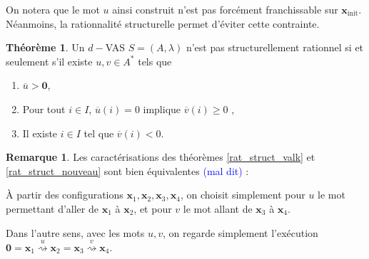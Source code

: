 \documentclass[a4paper,final]{article}
\theoremstyle{definition}
\newtheorem{Theorem}{Théorème}
\newtheorem*{Remark}{Remarque}
\let\geq\geqslant
\newcommand{\alain}[1]{\textcolor{blue}{#1}}
\newcommand{\transZ}[1]{\ensuremath{\stackrel{#1}{\rightsquigarrow}}}
\newcommand{\vect}[1]{\ensuremath{\mathbf{#1}}}
\newcommand{\xinit}{\ensuremath{\vect{x}_\text{init}}}
\newcommand{\valeur}[1]{\ensuremath{\overline{#1}}}
\begin{document}
On notera que le mot $u$ ainsi construit n'est pas forcément franchissable sur $\xinit$.
Néanmoins, la rationnalité structurelle permet d'éviter cette contrainte.

\begin{Theorem}\label{conf_struct_rat}
\label{rat_struct_nouveau}
Un $d-$VAS $S=(A,\lambda)$ n'est pas structurellement rationnel si et seulement s'il existe $u,v\in A^*$ tels que 
\begin{enumerate}
    \item $\valeur{u} > \vect{0}$,
    \item Pour tout $i \in I$, $\valeur{u}(i)=0$ implique $\valeur{v}(i) \geq 0$ ,
    \item Il existe $i\in I$ tel que $\valeur{v}(i) < 0$.
\end{enumerate}
\end{Theorem}

\begin{Remark}
Les caractérisations des théorèmes \ref{rat_struct_valk} et \ref{rat_struct_nouveau} sont bien équivalentes \alain{(mal dit)} :

\noindent À partir des configurations $\vect{x}_1, \vect{x}_2, \vect{x}_3, \vect{x}_4$, on choisit simplement pour $u$ le mot permettant d'aller de $\vect{x}_1$ à $\vect{x}_2$, et pour $v$ le mot allant de $\vect{x}_3$ à $\vect{x}_4$.

\noindent Dans l'autre sens, avec les mots $u,v$, on regarde simplement l'exécution $\vect{0} = \vect{x}_1 \transZ{u} \vect{x}_2 = \vect{x}_3 \transZ{v} \vect{x}_4$.
\end{Remark}
\end{document}
